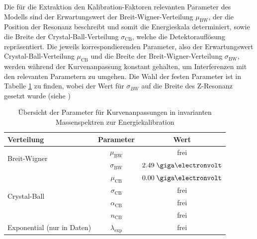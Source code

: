 Die für die Extraktion den Kalibration-Faktoren relevanten Parameter des
Modells sind der Erwartungswert der Breit-Wigner-Verteilung $\mu_\text{BW}$,
der die Position der Resonanz beschreibt und somit die Energieskala
determiniert, sowie die Breite der Crystal-Ball-Verteilung $\sigma_\text{CB}$,
welche die Detektorauflösung repräsentiert. Die jeweils korrespondierenden
Parameter, also der Erwartungswert Crystal-Ball-Verteilung $\mu_\text{CB}$ und
die Breite der Breit-Wigner-Verteilung $\sigma_\text{BW}$, werden während der
Kurvenanpassung konstant gehalten, um Interferenzen mit den relevanten
Parametern zu umgehen. Die Wahl der festen Parameter ist in Tabelle
\ref{tab:fit_parameters} zu finden, wobei der Wert für $\sigma_{BW}$ auf die
Breite des Z-Resonanz gesetzt wurde (siehe \cite{PhysRevD.86.010001})

\begin{table}[h]
    \centering
    \begin{tabular}{|l|c|c|}
        \hline
        \textbf{Verteilung} & \textbf{Parameter} & \textbf{Wert} \\
        \hline \hline
        \multirow{2}{*}{Breit-Wigner} & $\mu_\text{BW}$      & frei       \\
                                      & $\sigma_\text{BW}$   & $2.49\GeV$ \\
        \hline
        \multirow{4}{*}{Crystal-Ball} & $\mu_\text{CB}$      & $0.00\GeV$ \\
                                      & $\sigma_\text{CB}$   & frei       \\
                                      & $\alpha_\text{CB}$   & frei       \\
                                      & $n_\text{CB}$        & frei       \\
        \hline
        Exponential (nur in Daten)    & $\lambda_\text{exp}$ & frei       \\
        \hline
    \end{tabular}
    \caption{Übersicht der Parameter für Kurvenanpassungen in invarianten
        Massenspektren zur Energiekalibration}
    \label{tab:fit_parameters}
\end{table}

